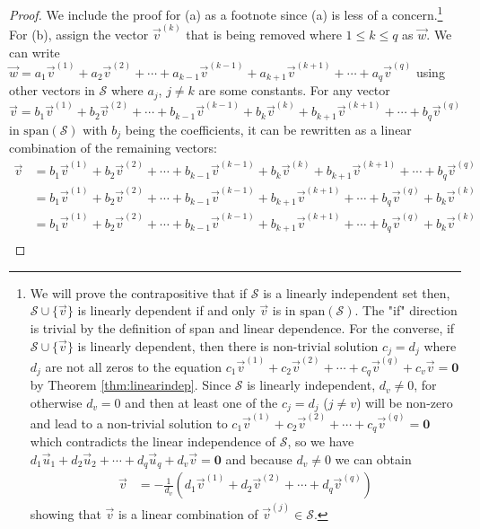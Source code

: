 \begin{proof}
We include the proof for (a) as a footnote since (a) is less of a concern.\footnote{We will prove the contrapositive that if $\mathcal{S}$ is a linearly independent set then, $\mathcal{S} \cup \{\vec{v}\}$ is linearly dependent if and only $\vec{v}$ is in $\text{span}(\mathcal{S})$. The "if" direction is trivial by the definition of span and linear dependence. For the converse, if $\mathcal{S} \cup \{\vec{v}\}$ is linearly dependent, then there is non-trivial solution $c_j = d_j$ where $d_j$ are not all zeros to the equation $c_1\vec{v}^{(1)} + c_2\vec{v}^{(2)} + \cdots + c_q\vec{v}^{(q)} + c_v\vec{v} = \textbf{0}$ by Theorem \ref{thm:linearindep}. Since $\mathcal{S}$ is linearly independent, $d_v \neq 0$, for otherwise $d_v = 0$ and then at least one of the $c_j = d_j$ ($j \neq v$) will be non-zero and lead to a non-trivial solution to $c_1\vec{v}^{(1)} + c_2\vec{v}^{(2)} + \cdots + c_q\vec{v}^{(q)} = \textbf{0}$ which contradicts the linear independence of $\mathcal{S}$, so we have $d_1\vec{u}_1 + d_2\vec{u}_2 + \cdots + d_q\vec{u}_q + d_v\vec{v} = \textbf{0}$ and because $d_v \neq 0$ we can obtain
\begin{align*}
\vec{v} &= -\frac{1}{d_v}(d_1\vec{v}^{(1)} + d_2\vec{v}^{(2)} + \cdots + d_q\vec{v}^{(q)})
\end{align*}
showing that $\vec{v}$ is a linear combination of $\vec{v}^{(j)} \in \mathcal{S}$.} For (b), assign the vector $\vec{v}^{(k)}$ that is being removed where $1 \leq k \leq q$ as $\vec{w}$. We can write $\vec{w} = a_1\vec{v}^{(1)} + a_2\vec{v}^{(2)} + \cdots + a_{k-1}\vec{v}^{(k-1)} + a_{k+1}\vec{v}^{(k+1)} + \cdots + a_q\vec{v}^{(q)}$ using other vectors in $\mathcal{S}$ where $a_j$, $j \neq k$ are some constants. For any vector $\vec{v} = b_1\vec{v}^{(1)} + b_2\vec{v}^{(2)} + \cdots + b_{k-1}\vec{v}^{(k-1)} + b_k\vec{v}^{(k)} + b_{k+1}\vec{v}^{(k+1)} + \cdots + b_q\vec{v}^{(q)}$ in $\text{span}(\mathcal{S})$ with $b_j$ being the coefficients, it can be rewritten as a linear combination of the remaining vectors:
\begin{align*}
\vec{v} &= b_1\vec{v}^{(1)} + b_2\vec{v}^{(2)} + \cdots + b_{k-1}\vec{v}^{(k-1)} + b_k\vec{v}^{(k)} + b_{k+1}\vec{v}^{(k+1)} + \cdots + b_q\vec{v}^{(q)} \\
&= b_1\vec{v}^{(1)} + b_2\vec{v}^{(2)} + \cdots + b_{k-1}\vec{v}^{(k-1)} + b_{k+1}\vec{v}^{(k+1)} + \cdots + b_q\vec{v}^{(q)} + b_k\vec{v}^{(k)} \\
&= b_1\vec{v}^{(1)} + b_2\vec{v}^{(2)} + \cdots + b_{k-1}\vec{v}^{(k-1)} + b_{k+1}\vec{v}^{(k+1)} + \cdots + b_q\vec{v}^{(q)} + b_k\vec{v}^{(k)} \\

\end{align*}
\end{proof}
